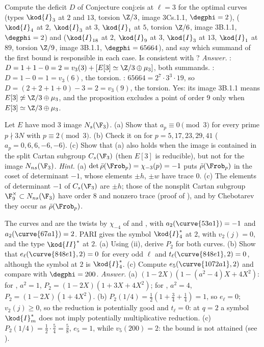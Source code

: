 \begin{sloppypar}
\begin{exercise}\label{ex:paper:deficits}
Compute the deficit $D$ of Conjecture conj:eis at $\ell=3$ for the optimal curves  (types $\kod{I}_3$ at $2$ and $13$, torsion $\Z/3$, image 3Cs.1.1, $\degphi=2$), 
($\kod{I}_4$ at $2$, $\kod{I}_3$ at $3$, $\kod{I}_1$ at $5$, torsion $\Z/6$, image 3B.1.1, $\degphi=2$) and  ($\kod{I}_{18}$ at $2$, $\kod{I}_9$ at $3$, $\kod{I}_3$ at $13$, $\kod{I}_1$ at $89$,
torsion $\Z/9$, image 3B.1.1, $\degphi=65664$), and say which summand of the first bound is responsible in each case. Is  consistent with ?
\emph{Answer.} : $D=1+1-0=2=v_3(3)+[E[3]\simeq\Z/3\oplus\mu_3]$, both summands. : $D=1-0=1=v_3(6)$, the torsion. : $65664=2^7\cdot3^3\cdot19$, so
$D=(2+2+1+0)-3=2=v_3(9)$, the torsion. Yes: its image 3B.1.1 means $E[3]\not\simeq\Z/3\oplus\mu_3$, and the proposition excludes a point of order $9$ only when $E[3]\simeq\Z/3\oplus\mu_3$.
\end{exercise}

\begin{exercise}\label{ex:paper:ns-ap}
Let $E$ have mod $3$ image $N_s(\F_3)$. (a) Show that $a_p\equiv0\pmod3$ for every prime $p\nmid3N$ with $p\equiv2\pmod3$. (b) Check it on  for $p=5,17,23,29,41$ ($a_p=0,6,6,-6,-6$). (c) Show
that (a) also holds when the image is contained in the split Cartan subgroup $C_s(\F_3)$ (then $E[3]$ is reducible), but not for the image $N_{ns}(\F_3)$.
\emph{Hint.} (a) $\det\bar\rho(\Frob_p)=\chi_{-3}(p)=-1$ puts $\bar\rho(\Frob_p)$ in the coset of determinant $-1$, whose elements $\pm h$, $\pm w$ have trace $0$. (c) The elements of determinant $-1$
of $C_s(\F_3)$ are $\pm h$; those of the nonsplit Cartan subgroup $\F_9^\times\subset N_{ns}(\F_3)$ have order $8$ and nonzero trace (proof of ), and by Chebotarev they occur as
$\bar\rho(\Frob_p)$.
\end{exercise}

\begin{exercise}\label{ex:paper:wild-two}
The curves  and  are the twists by $\chi_{-4}$ of  and , with $a_2(\curve{53a1})=-1$ and $a_2(\curve{67a1})=2$. PARI gives  the symbol
$\kod{I}_4^*$ at $2$, with $v_2(j)=0$, and  the type $\kod{II}^*$ at $2$. (a) Using (ii), derive $P_2$ for both curves. (b) Show that $e_\ell(\curve{848e1},2)=0$
for every odd $\ell$ and $t_\ell(\curve{848e1},2)=0$, although the symbol at $2$ is $\kod{I}_4^*$. (c) Compute $e_5(\curve{1072a1},2)$ and compare with $\degphi=200$.
\emph{Answer.} (a) $(1-2X)(1-(a^2-4)X+4X^2)$: for , $a^2=1$, $P_2=(1-2X)(1+3X+4X^2)$; for , $a^2=4$, $P_2=(1-2X)(1+4X^2)$. (b) $P_2(1/4)=\frac12(1+\frac34+\frac14)=1$, so
$e_\ell=0$; $v_2(j)\ge0$, so the reduction is potentially good and $t_\ell=0$: at $q=2$ a symbol $\kod{I}_m^*$ does not imply potentially multiplicative reduction. (c) $P_2(1/4)=\frac12\cdot\frac54=\frac58$,
$e_5=1$, while $v_5(200)=2$: the bound is not attained (see ).
\end{exercise}


\end{sloppypar}
